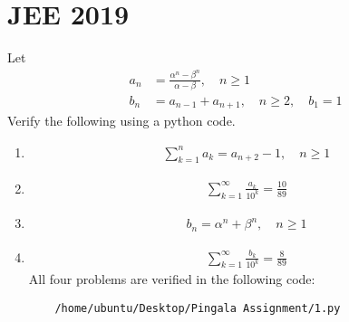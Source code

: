 \documentclass[journal,12pt,twocolumn]{IEEEtran}
\renewcommand\thesection{\arabic{section}}
\begin{document}
\section{JEE 2019}
Let 
\begin{align}
	a_n &= \frac{\alpha^{n}-\beta^{n}}{\alpha - \beta}, \quad n \ge 1
	\\
	b_n &= a_{n-1} + a_{n+1}, \quad n \ge 2, \quad b_1 =1
	\label{eq:10-orig-diff}
\end{align}
Verify the following using a python code.
\begin{enumerate}[label=\thesection.\arabic*
,ref=\thesection.\theenumi]
\item 
\begin{align}
	\sum_{k=1}^{n}a_k = a_{n+2}-1, \quad n \ge 1
\end{align}
 \item 
\begin{align}
	\sum_{k=1}^{\infty}\frac{a_k}{10^k} =\frac{10}{89}
\end{align}
 \item 
\begin{align}
	b_n =\alpha^n + \beta^n, \quad n \ge 1
\end{align}
 \item 
\begin{align}
	\sum_{k=1}^{\infty}\frac{b_k}{10^k} =\frac{8}{89}
\end{align}
All four problems are verified in the following code:
\begin{lstlisting}
	/home/ubuntu/Desktop/Pingala Assignment/1.py
\end{lstlisting}
\end{enumerate}
\end{document}
